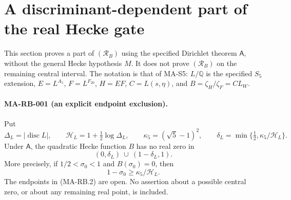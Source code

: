 \section{A discriminant-dependent part of the real Hecke gate}
\label{sec:s5-real-zero-free}

This section proves a part of $(\mathcal R_B)$ using the specified
Dirichlet theorem $\mathsf A$, without the general Hecke hypothesis
$M$.  It does not prove $(\mathcal R_B)$ on the remaining central
interval.  The notation is that of MA-S5:
$L/\mathbb Q$ is the specified $S_5$ extension,
$E=L^{A_5}$, $F=L^{F_{20}}$, $H=EF$,
$C=L(s,\eta)$, and $B=\zeta_H/\zeta_F=C L_W$.

\paragraph{MA-RB-001 (an explicit endpoint exclusion).}
Put
\[
 \Delta_L=|\operatorname{disc}L|,\qquad
 \mathcal H_L=1+\tfrac12\log\Delta_L,\qquad
 \kappa_5=(\sqrt5-1)^2,\qquad
 \delta_L=\min\{\tfrac12,\kappa_5/\mathcal H_L\}.
 \tag{MA-RB.1}
\]
Under $\mathsf A$, the quadratic Hecke function $B$ has no real zero in
\[
              (0,\delta_L)\ \cup\ (1-\delta_L,1).
 \tag{MA-RB.2}
\]
More precisely, if $1/2<\sigma_0<1$ and $B(\sigma_0)=0$, then
\[
        1-\sigma_0\ge\kappa_5/\mathcal H_L.
 \tag{MA-RB.3}
\]
The endpoints in (MA-RB.2) are open.  No assertion about a possible
central zero, or about any remaining real point, is included.

